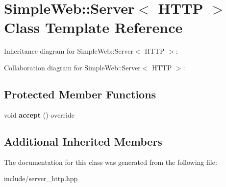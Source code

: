 \hypertarget{classSimpleWeb_1_1Server_3_01HTTP_01_4}{}\section{Simple\+Web\+:\+:Server$<$ H\+T\+TP $>$ Class Template Reference}
\label{classSimpleWeb_1_1Server_3_01HTTP_01_4}


Inheritance diagram for Simple\+Web\+:\+:Server$<$ H\+T\+TP $>$\+:


Collaboration diagram for Simple\+Web\+:\+:Server$<$ H\+T\+TP $>$\+:
\subsection*{Protected Member Functions}
\begin{DoxyCompactItemize}
\item 
void {\bfseries accept} () override\hypertarget{classSimpleWeb_1_1Server_3_01HTTP_01_4_a68e281aef8ea819b52280a67018d1d32}{}\label{classSimpleWeb_1_1Server_3_01HTTP_01_4_a68e281aef8ea819b52280a67018d1d32}

\end{DoxyCompactItemize}
\subsection*{Additional Inherited Members}


The documentation for this class was generated from the following file\+:\begin{DoxyCompactItemize}
\item 
include/server\+\_\+http.\+hpp\end{DoxyCompactItemize}
